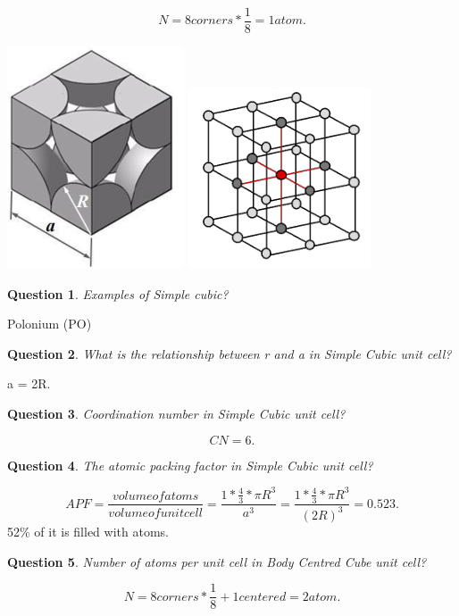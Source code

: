 \documentclass[13]{article}
\newtheorem{exer}{Question}
\begin{document}
\[
N = 8 corners * \frac{1}{8} = 1 atom 
.\]
\begin{center}
\includegraphics[scale=0.5]{figures/6.png} \includegraphics[scale=0.5]{figures/7.png}
\end{center}
\begin{exer}
Examples of Simple cubic?
\end{exer}
Polonium (PO)
\begin{exer}
What is the relationship between r and a in Simple Cubic unit cell?
\end{exer}
a = 2R.
\begin{exer}
Coordination number in Simple Cubic unit cell?
\end{exer}
\[
CN=6
.\] 
\begin{exer}
The atomic packing factor in Simple Cubic unit cell?
\end{exer}
\[
	APF = \frac{volume of atoms}{volume of unit cell} = \frac{1* \frac{4}{3} * \pi R^3}{a^3}= \frac{1* \frac{4}{3} * \pi R^3}{(2R)^3} = 0.523
.\] 
52\% of it is filled with atoms. 
\begin{exer}
Number of atoms per unit cell in Body Centred Cube unit cell?
\end{exer}
\[
N = 8 corners * \frac{1}{8} + 1 centered = 2 atom 
.\]
\end{document}
